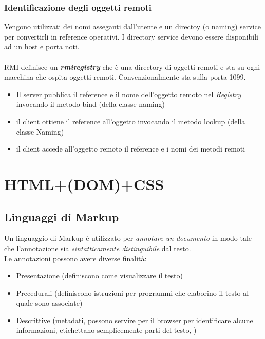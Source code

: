 \documentclass[12pt, a4paper]{article}
\begin{document}
    \subsubsection*{Identificazione degli oggetti remoti}
    Vengono utilizzati dei nomi asseganti dall'utente e un directoy (o naming) service per convertirli in reference operativi.
    I directory service devono essere disponibili ad un host e porta noti.
    \\\\RMI definisce un \textbf{\textit{rmiregistry}} che è una directory di oggetti remoti e sta su ogni macchina che ospita oggetti remoti.   
    Convenzionalmente sta sulla porta 1099.

    \begin{itemize}
        \item Il server pubblica il reference e il nome dell'oggetto remoto nel \textit{Registry} invocando il metodo bind (della classe naming)
        \item il client ottiene il reference all'oggetto invocando il metodo lookup (della classe Naming)
        \item il client accede all'oggetto remoto il reference e i nomi dei metodi remoti
    \end{itemize} 













    \newpage
    \section{HTML+(DOM)+CSS}
    \subsection{Linguaggi di Markup}
    Un linguaggio di Markup è utilizzato per \textit{annotare un documento} in modo 
    tale che l'annotazione sia \textit{sintatticamente distinguibile} dal testo.
    \\Le annotazioni possono avere diverse finalità:
    \begin{itemize}
        \item Presentazione (definiscono come visualizzare il testo)
        \item Precedurali (definiscono istruzioni per programmi che elaborino il testo al quale sono associate)
        \item Descrittive (metadati, possono servire per il browser per identificare alcune informazioni, etichettano semplicemente parti del testo, )
    \end{itemize}
\end{document}

